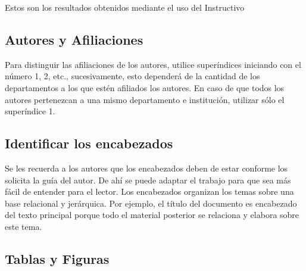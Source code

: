     Estos son los resultados obtenidos mediante el uso del Instructivo
    \newpage
    \label{anexo:evidencias}
    
    
    
    \subsection{Autores y Afiliaciones}
    
    Para distinguir las afiliaciones de los autores, utilice superíndices iniciando con el número 1, 2, etc., sucesivamente, esto dependerá de la cantidad de los departamentos a los que estén afiliados los autores. En caso de que todos los autores pertenezcan a una mismo departamento e institución, utilizar sólo el superíndice 1. 
    
    \subsection{Identificar los encabezados}
    
    Se les recuerda a los autores que los encabezados deben de estar conforme los solicita la guía del autor. De ahí se puede adaptar el trabajo para que sea más fácil de entender para el lector.
    Los encabezados organizan los temas sobre una base relacional y jerárquica. Por ejemplo, el título del documento es encabezado del texto principal porque todo el material posterior se relaciona y elabora sobre este tema. 
    
    \subsection{Tablas y Figuras}
    \newpage
    \label{anexo:Tiempos}
    
    
